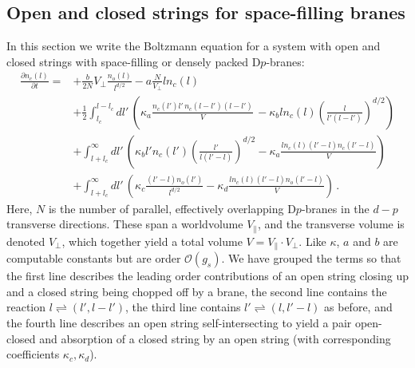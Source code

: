 \documentclass[a4paper,11pt]{article}
\newcommand{\lr}[1]{\left(#1\right)}
\begin{document}
\subsection{Open and closed strings for space-filling branes}
In this section we write the Boltzmann equation for a system with open and closed strings with space-filling or densely packed D$p$-branes:
\begin{equation}\label{eq:boltzmannbrane}
\begin{split}
     \frac{\partial n_c(l)}{\partial t}= & +\frac{b}{2N}V_\perp\frac{n_o(l)}{l^{d/2}} -a\frac{N}{V_\perp}ln_c(l) \\ &
     +\frac{1}{2} \int_{l_c}^{l-l_c}{dl' \,\lr{\kappa_a \frac{n_c(l') l'\, n_c(l-l') (l-l')}{V}\, -\kappa_b ln_c(l) \lr{\frac{l}{l'(l-l')}}^{d/2}}}   \\ &
     + \int_{l+l_c}^\infty{dl' \,  \lr{\kappa_b l'n_c(l')\lr{\frac{l'}{l(l'-l)}}^{d/2}-\kappa_a \frac{ln_c(l)(l'-l)n_c(l'-l)}{V} }} \, \\ &
    +\int_{l+l_c}^\infty{dl' \, \lr{\kappa_c \frac{(l'-l)n_o(l')}{l^{d/2}}  -\kappa_d \frac{ln_c(l)(l'-l)n_o(l'-l)}{V} }} \, .
\end{split}
\end{equation}
Here, $N$ is the number of parallel, effectively overlapping D$p$-branes in the $d-p$ transverse directions.
These span a worldvolume $V_\parallel$, and the transverse volume is denoted $V_\perp$, which together yield a total volume $V=V_\parallel \cdot V_\perp$.
Like $\kappa$, $a$ and $b$ are computable constants but are order $\mathcal{O}(g_s)$. 
We have grouped the terms so that the first line describes the leading order contributions of an open string closing up and a closed string being chopped off by a brane, the second line contains the reaction $l \rightleftharpoons (l',l-l')$, the third line contains $l' \rightleftharpoons (l,l'-l)$ as before, and the fourth line describes an open string self-intersecting to yield a pair open-closed and absorption of a closed string by an open string (with corresponding coefficients $\kappa_c,\kappa_d$). 
\\
\end{document}
